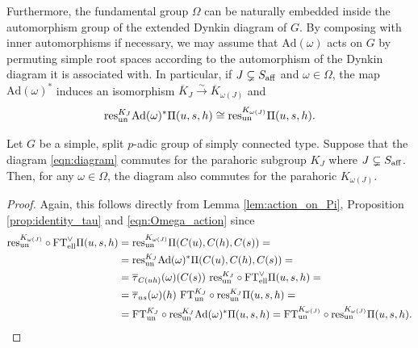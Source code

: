 Furthermore, the fundamental group $\Omega$ can be naturally embedded inside the automorphism group of the extended Dynkin diagram of $G$. By composing with inner automorphisms if necessary, we may assume that $\mathrm{Ad}(\omega)$ acts on $G$ by permuting simple root spaces according to the automorphism of the Dynkin diagram it is associated with. In particular, if $J\subsetneq S_{\mathrm{aff}}$ and $\omega\in\Omega$, the map $\mathrm{Ad}(\omega)^*$ induces an isomorphism $\overline{K}_J\xrightarrow{\sim} \overline{K}_{\omega(J)}$ and 
\begin{equation}\label{eqn:Omega_action}
    \mathrm{res}_{\mathrm{un}}^{K_J}\mathrm{Ad}(\omega)^*\Pi(u,s,h)\cong\mathrm{res}_{\mathrm{un}}^{K_{\omega(J)}}\Pi(u,s,h).
\end{equation}
\begin{proposition}\label{prop:omega_action}
    Let $G$ be a simple, split $p$-adic group of simply connected type. Suppose that the diagram \eqref{eqn:diagram} commutes for the parahoric subgroup $K_J$ where $J\subsetneq S_{\mathrm{aff}}$. Then, for any $\omega\in\Omega$, the diagram also commutes for the parahoric $K_{\omega(J)}$.
\end{proposition}
\begin{proof}
    Again, this follows directly from Lemma \ref{lem:action_on_Pi}, Proposition \ref{prop:identity_tau} and \eqref{eqn:Omega_action} since
    \begin{align*}
        \res^{K_{\omega(J)}}_{\un}\circ\FT^\vee_{\mathrm{ell}}\Pi(u,s,h)&=\res^{K_{\omega(J)}}_{\un}\Pi(C(u),C(h),C(s))=\\
        &=\res^{K_J}_{\un}\mathrm{Ad}(\omega)^*\Pi(C(u),C(h),C(s))=\\
        &=\overline{\tau}_{C(uh)}(\omega)(C(s))\ \res^{K_J}_{\un}\circ\FT^\vee_{\mathrm{ell}}\Pi(u,s,h)=\\
        &=\overline{\tau}_{us}(\omega)(h)\ \FT^{K_J}_{\un}\circ\res^{K_J}_{\un}\Pi(u,s,h)=\\
        &=\FT^{K_J}_{\un}\circ\res^{K_J}_{\un}\mathrm{Ad}(\omega)^*\Pi(u,s,h)=\FT^{K_{\omega(J)}}_{\un}\circ\res^{K_{\omega(J)}}_{\un}\Pi(u,s,h).
    \end{align*}
\end{proof}

